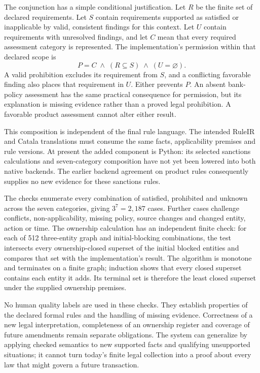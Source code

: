 The conjunction has a simple conditional justification. Let $R$ be the finite
set of declared requirements. Let $S$ contain requirements supported as satisfied
or inapplicable by valid, consistent findings for this context. Let $U$ contain
requirements with unresolved findings, and let $C$ mean that every required
assessment category is represented. The implementation's permission within
that declared scope is
\[
   P = C \;\land\; (R\subseteq S) \;\land\; (U=\varnothing).
\]
A valid prohibition excludes its requirement from $S$, and a conflicting
favorable finding also places that requirement in $U$. Either prevents $P$.
An absent bank-policy assessment has the same practical consequence for
permission, but its explanation is missing evidence rather than a proved legal
prohibition. A favorable product assessment cannot alter either result.

This composition is independent of the final rule language. The intended
RuleIR and Catala translations must consume the same facts, applicability
premises and rule versions. At present the added component is Python: its
selected sanctions calculations and seven-category composition have not yet
been lowered into both native backends. The earlier backend agreement on
product rules consequently supplies no new evidence for these sanctions rules.

The checks enumerate every combination of satisfied, prohibited and unknown
across the seven categories, giving $3^7=2{,}187$ cases. Further cases challenge
conflicts, non-applicability, missing policy, source changes and changed entity,
action or time. The ownership calculation has an independent finite check: for
each of 512 three-entity graph and initial-blocking combinations, the test
intersects every ownership-closed superset of the initial blocked entities and
compares that set with the implementation's result. The algorithm is monotone
and terminates on a finite graph; induction shows that every closed superset
contains each entity it adds. Its terminal set is therefore the least closed
superset under the supplied ownership premises.

No human quality labels are used in these checks. They establish properties of
the declared formal rules and the handling of missing evidence. Correctness of
a new legal interpretation, completeness of an ownership register and coverage
of future amendments remain separate obligations. The system can generalize by
applying checked semantics to new supported facts and qualifying unsupported
situations; it cannot turn today's finite legal collection into a proof about
every law that might govern a future transaction.
